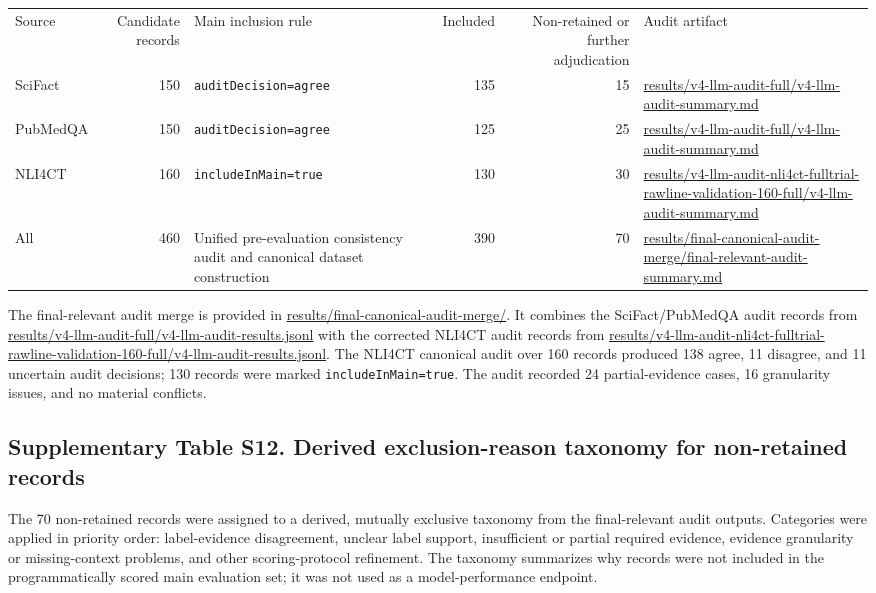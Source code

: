 \documentclass[
  8pt,
]{extarticle}
\begin{document}
\begin{center}
\begin{adjustbox}{max width=0.95\textwidth}
\begin{tabular}{@{}
lrlrrl@{}}
\toprule\noalign{}
Source & Candidate records & Main inclusion rule & Included &
Non-retained or further adjudication & Audit artifact \\

SciFact & 150 & \texttt{auditDecision=agree} & 135 & 15 &
\url{results/v4-llm-audit-full/v4-llm-audit-summary.md} \\
PubMedQA & 150 & \texttt{auditDecision=agree} & 125 & 25 &
\url{results/v4-llm-audit-full/v4-llm-audit-summary.md} \\
NLI4CT & 160 & \texttt{includeInMain=true} & 130 & 30 &
\url{results/v4-llm-audit-nli4ct-fulltrial-rawline-validation-160-full/v4-llm-audit-summary.md} \\
All & 460 & Unified pre-evaluation consistency audit and canonical
dataset construction & 390 & 70 &
\url{results/final-canonical-audit-merge/final-relevant-audit-summary.md} \\
\bottomrule
\end{tabular}
\end{adjustbox}
\end{center}

The final-relevant audit merge is provided in
\url{results/final-canonical-audit-merge/}. It combines the
SciFact/PubMedQA audit records from
\url{results/v4-llm-audit-full/v4-llm-audit-results.jsonl} with the
corrected NLI4CT audit records from
\url{results/v4-llm-audit-nli4ct-fulltrial-rawline-validation-160-full/v4-llm-audit-results.jsonl}.
The NLI4CT canonical audit over 160 records produced 138 agree, 11
disagree, and 11 uncertain audit decisions; 130 records were marked
\texttt{includeInMain=true}. The audit recorded 24 partial-evidence
cases, 16 granularity issues, and no material conflicts.

\hypertarget{supplementary-table-s12-derived-exclusion-reason-taxonomy-for-non-retained-records}{%
\subsection{Supplementary Table S12. Derived exclusion-reason taxonomy
for non-retained
records}\label{supplementary-table-s12-derived-exclusion-reason-taxonomy-for-non-retained-records}}

The 70 non-retained records were assigned to a derived, mutually
exclusive taxonomy from the final-relevant audit outputs. Categories
were applied in priority order: label-evidence disagreement, unclear
label support, insufficient or partial required evidence, evidence
granularity or missing-context problems, and other scoring-protocol
refinement. The taxonomy summarizes why records were not included in the
programmatically scored main evaluation set; it was not used as a
model-performance endpoint.
\end{document}
